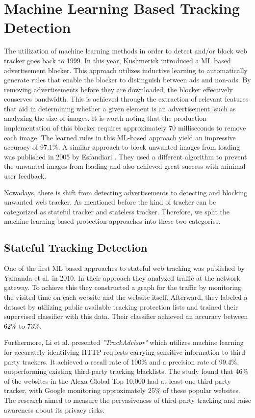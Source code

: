 \section{Machine Learning Based Tracking Detection}

The utilization of machine learning methods in order to detect and/or block web tracker goes back to 1999. In this year, Kushmerick \cite{kushmerick1999learning}
introduced a ML based advertisement blocker. This approach utilizes inductive learning to automatically
generate rules that enable the blocker to distinguish between ads and non-ads. By removing advertisements before they are downloaded,
the blocker effectively conserves bandwidth. This is achieved through the extraction of relevant features that aid in determining
whether a given element is an advertisement, such as analyzing the size of images. It is worth noting that the production implementation of
this blocker requires approximately 70 milliseconds to remove each image. The learned rules in this ML-based approach yield an
impressive accuracy of 97.1\%. A similar approach to block unwanted images from loading was published in 2005 by Esfandiari \cite{esfandiari2005adaptive}.
They used a different algorithm to prevent the unwanted images from loading and also achieved great success with minimal user feedback.

Nowadays, there is shift from detecting advertisements to detecting and blocking unwanted web tracker. As mentioned before 
the kind of tracker can be categorized as stateful tracker and stateless tracker. Therefore, we split the machine learning based
protection approaches into these two categories.

\subsection{Stateful Tracking Detection}

One of the first ML based approaches to stateful web tracking was published by Yamanda et al. \cite{yamada2010web} in 2010.
In their approach they analyzed traffic at the network gateway. To achieve this they constructed a graph for the traffic by monitoring the visited
time on each website and the website itself. Afterward, they labeled a dataset by utilizing public available tracking protection lists
and trained their supervised classifier with this data. Their classifier achieved an accuracy between 62\% to 73\%.

Furthermore, Li et al. \cite{li2015trackadvisor} presented \emph{"TrackAdvisor"} which utilizes machine learning for 
accurately identifying HTTP requests carrying sensitive information to third-party trackers. It achieved a recall rate of 100\% and a precision rate of 99.4\%, outperforming
existing third-party tracking blacklists. The study found that 46\% of the websites in the Alexa Global Top 10,000 had at least
one third-party tracker, with Google monitoring approximately 25\% of these popular websites. The research aimed to measure
the pervasiveness of third-party tracking and raise awareness about its privacy risks.

